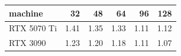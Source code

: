 \begin{tabular}{lrrrrr}
\toprule
machine & 32 & 48 & 64 & 96 & 128 \\
\midrule
RTX 5070 Ti & 1.41 & 1.35 & 1.33 & 1.11 & 1.12 \\
RTX 3090 & 1.23 & 1.20 & 1.18 & 1.11 & 1.07 \\
\bottomrule
\end{tabular}
